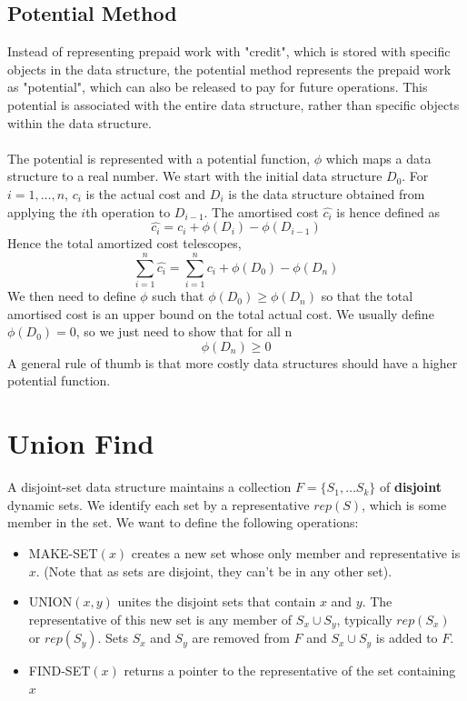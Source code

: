 \documentclass{article}
\theoremstyle{plain}
\theoremstyle{definition}
\begin{document}
    \subsection{Potential Method}
        Instead of representing prepaid work with "credit", which is stored with specific objects in the data structure, the potential method represents the prepaid work as "potential", which can also be released to pay for future operations. This potential is associated with the entire data structure, rather than specific objects within the data structure. \\ \\ 
        The potential is represented with a potential function, $\phi$ which maps a data structure to a real number. We start with the initial data structure $D_0$. For $i = 1, \ldots, n$, $c_i$ is the actual cost and $D_i$ is the data structure obtained from applying the $i$th operation to $D_{i-1}$. The amortised cost $\hat{c_i}$ is hence defined as 
        \[ \hat{c_i} = c_i + \phi(D_i) - \phi(D_{i-1})\]
        Hence the total amortized cost telescopes,
        \[ \sum^n_{i=1} \hat{c_i} = \sum^n_{i=1} c_i + \phi(D_0) - \phi(D_n) \]
        We then need to define $\phi$ such that $\phi(D_0) \geq \phi(D_n)$ so that the total amortised cost is an upper bound on the total actual cost. We usually define $\phi(D_0) = 0$, so we just need to show that for all n
        \[ \phi(D_n) \geq 0 \]
        A general rule of thumb is that more costly data structures should have a higher potential function. 
    
\section{Union Find}
    A disjoint-set data structure maintains a collection $F = \{ S_1, \ldots S_k \}$ of \textbf{disjoint} dynamic sets. We identify each set by a representative $rep(S)$, which is some member in the set. We want to define the following operations:
    \begin{itemize}
        \item MAKE-SET$(x)$ creates a new set whose only member and representative is $x$. (Note that as sets are disjoint, they can't be in any other set). 
        \item UNION$(x, y)$ unites the disjoint sets that contain $x$ and $y$. The representative of this new set is any member of $S_x \cup S_y$, typically $rep(S_x)$ or $rep(S_y)$. Sets $S_x$ and $S_y$ are removed from $F$ and $S_x \cup S_y$ is added to $F$. 
        \item FIND-SET$(x)$ returns a pointer to the representative of the set containing $x$
    \end{itemize}
\end{document}
